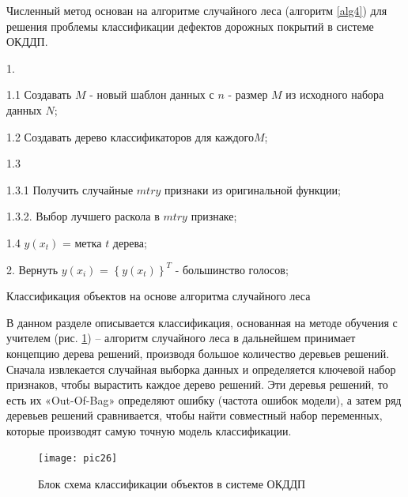 Численный метод основан на алгоритме случайного леса (алгоритм \ref{alg4}) для решения проблемы классификации дефектов дорожных покрытий в системе ОКДДП.
\begin{algorithm}[ht!]
   1. 
     {
		1.1 Создавать $M$ - новый шаблон данных с $n$ - размер $M$ из исходного набора данных $N$;
		
		1.2 Создавать дерево классификаторов для каждого$M$;
		
		1.3 
     {
		  1.3.1 Получить случайные  $mtry$ признаки из оригинальной функции;
			
			1.3.2. Выбор лучшего раскола в $mtry$ признаке;
		}
		1.4 $y\left(x_t\right)$ = метка $t$ дерева; 
		}
		
		2. Вернуть $y\left(x_i\right)$ = $\left\{y\left(x_t\right)\right\}^T$ - большинство голосов;
		
  \caption{Классификация объектов на основе алгоритма случайного леса}\label{alg4}
	
\end{algorithm}

В данном разделе описывается классификация, основанная на методе обучения с учителем (рис. \ref{pic26}) -- алгоритм случайного леса в дальнейшем принимает концепцию дерева решений, производя большое количество деревьев решений. Сначала извлекается случайная выборка данных и определяется ключевой набор признаков, чтобы вырастить каждое дерево решений. Эти деревья решений, то есть их «Out-Of-Bag» определяют ошибку (частота ошибок модели), а затем ряд деревьев решений сравнивается, чтобы найти совместный набор переменных, которые производят самую точную модель классификации.

\begin{figure}[ht!]
\centering
\texttt{[image: pic26]}
\caption{Блок схема классификации объектов в системе ОКДДП}
	\label{pic26}
		\end{figure}	

